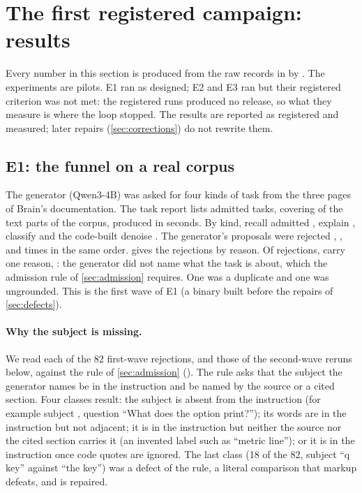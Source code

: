 
\section{The first registered campaign: results}\label{sec:results}

Every number in this section is produced from the raw records in 
by . The experiments are pilots. E1 ran as designed; E2 and E3
ran but their registered criterion was not met: the registered runs produced no release, so
what they measure is where the loop stopped. The results are reported as registered and
measured; later repairs (\cref{sec:corrections}) do not rewrite them.

\subsection{E1: the funnel on a real corpus}\label{sec:e1}

The generator (Qwen3-4B) was asked for four kinds of task from the three pages of
Brain's documentation. The task report lists \mEOneTasks{} admitted tasks, covering
\mEOneParts{} of the \mEOnePartsTotal{} text parts of the corpus,
produced in \mEOneElapsedSecs{} seconds. By kind,
recall admitted \mEOneAdmittedRecall, explain \mEOneAdmittedExplain, classify
\mEOneAdmittedClassify{} and the code-built denoise \mEOneAdmittedDenoise.
The generator's proposals were rejected \mEOneRejectedRecall, \mEOneRejectedExplain,
\mEOneRejectedClassify{} and \mEOneRejectedDenoise{} times in the same order.
 gives the rejections by reason. Of \mEOneRejectedTotal{} rejections,
\mEOneReasonNoSubject{} carry one reason, : the generator did not
name what the task is about, which the admission rule of \cref{sec:admission}
requires. One was a duplicate and one was ungrounded.
This is the first wave of E1 (a binary built before the repairs of \cref{sec:defects}).

\paragraph{Why the subject is missing.} We read each of the 82 first-wave rejections, and
those of the second-wave reruns below, against the rule of \cref{sec:admission}
(). The rule asks that the subject the generator names
be in the instruction and be named by the source or a cited section. Four classes result:
the subject is absent from the instruction (for example subject , question
``What does the  option print?''); its words are in the instruction but not
adjacent; it is in the instruction but neither the source nor the cited section carries it
(an invented label such as ``metric line''); or it is in the instruction once code quotes
are ignored. The last class (18 of the 82, subject ``q key'' against ``the  key'')
was a defect of the rule, a literal comparison that markup defeats, and is repaired.

